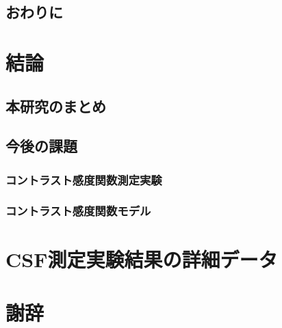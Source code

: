 \documentclass[11pt,oneside,openany,report]{jsbook}
\begin{document}
  \section{おわりに}


\chapter{結論}

  \section{本研究のまとめ}

  \section{今後の課題}

    \subsection{コントラスト感度関数測定実験}

    \subsection{コントラスト感度関数モデル}


\appendix
\chapter{CSF測定実験結果の詳細データ}


\backmatter
\chapter{謝辞}




\end{document}
